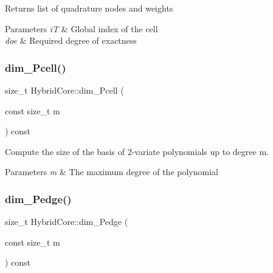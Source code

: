 \begin{DoxyReturn}{Returns}
list of quadrature nodes and weights 
\end{DoxyReturn}

\begin{DoxyParams}{Parameters}
{\em iT} & Global index of the cell \\
\hline
{\em doe} & Required degree of exactness \\
\hline
\end{DoxyParams}
\mbox{\label{classHArDCore2D_1_1HybridCore_aa2bdc59d150566e1b992058031509d2f}} 
\subsubsection{\texorpdfstring{dim\+\_\+\+Pcell()}{dim\_Pcell()}}
{\footnotesize\ttfamily size\+\_\+t Hybrid\+Core\+::dim\+\_\+\+Pcell (\begin{DoxyParamCaption}\item[{const size\+\_\+t}]{m }\end{DoxyParamCaption}) const}



Compute the size of the basis of 2-\/variate polynomials up to degree m. 


\begin{DoxyParams}{Parameters}
{\em m} & The maximum degree of the polynomial \\
\hline
\end{DoxyParams}
\mbox{\label{classHArDCore2D_1_1HybridCore_ab0fb57313f27fb8b4a6e9747de1d5cfe}} 
\subsubsection{\texorpdfstring{dim\+\_\+\+Pedge()}{dim\_Pedge()}}
{\footnotesize\ttfamily size\+\_\+t Hybrid\+Core\+::dim\+\_\+\+Pedge (\begin{DoxyParamCaption}\item[{const size\+\_\+t}]{m }\end{DoxyParamCaption}) const}



